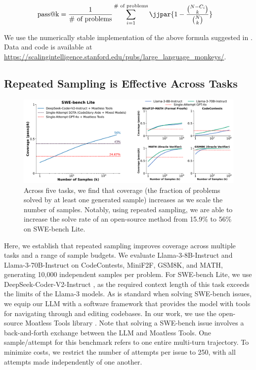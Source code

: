 \documentclass[11pt]{article}
\begin{document}
\begin{align}
    \text{pass@k} &= \frac{1}{\text{\# of problems}} \sum_{i = 1}^{\text{\# of problems}} \jjpar{1 - \frac{\binom{N - C_i}{k}}{\binom{N}{k}}}
\end{align}

We use the numerically stable implementation of the above formula suggested in \citet{chen2021evaluatinglargelanguagemodels}.
Data and code is available at \url{https://scalingintelligence.stanford.edu/pubs/large_language_monkeys/}.

\subsection{Repeated Sampling is Effective Across Tasks}
\label{sec:tasks}

\begin{figure}[t]
    \centering
    \includegraphics[width=\textwidth]{figures/across_tasks.pdf}
    \caption{Across five tasks, we find that coverage (the fraction of problems solved by at least one generated sample) increases as we scale the number of samples. Notably, using repeated sampling, we are able to increase the solve rate of an open-source method from 15.9\% to 56\% on SWE-bench Lite.}  
    \label{fig:across_tasks}
\end{figure}


Here, we establish that repeated sampling improves coverage across multiple tasks and a range of sample budgets. We evaluate Llama-3-8B-Instruct and Llama-3-70B-Instruct on CodeContests, MiniF2F, GSM8K, and MATH, generating 10,000 independent samples per problem. For SWE-bench Lite, we use DeepSeek-Coder-V2-Instruct \cite{deepseekai2024deepseekv2strongeconomicalefficient}, as the required context length of this task exceeds the limits of the Llama-3 models. As is standard when solving SWE-bench issues, we equip our LLM with a software framework that provides the model with tools for navigating through and editing codebases. In our work, we use the open-source Moatless Tools library \cite{moatless}. Note that solving a SWE-bench issue involves a back-and-forth exchange between the LLM and Moatless Tools. One sample/attempt for this benchmark refers to one entire multi-turn trajectory. To minimize costs, we restrict the number of attempts per issue to 250, with all attempts made independently of one another.
\end{document}
